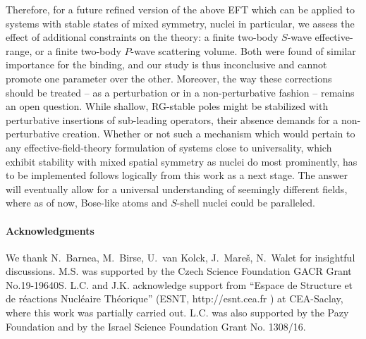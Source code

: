 \documentclass[preprint,12pt]{elsarticle}
\begin{document}
Therefore, for a future refined version of the above EFT which can be applied to systems with stable states of mixed symmetry,
nuclei in particular, we assess the effect of additional constraints on the theory: a finite two-body $S$-wave effective-range,
or a finite two-body $P$-wave scattering volume. 
Both were found of similar importance for the binding, and our study is thus inconclusive and cannot promote one parameter over the other.
Moreover, the way these corrections should be treated -- as a perturbation or in a non-perturbative fashion -- remains an open question.
While shallow, RG-stable poles might be stabilized with perturbative insertions of sub-leading operators, their absence demands for a
non-perturbative creation.
Whether or not such a mechanism which would pertain to any effective-field-theory formulation of systems close to universality,
which exhibit stability with mixed spatial symmetry as nuclei do most prominently, has to be implemented follows logically from
this work as a next stage. The answer will eventually allow for a universal understanding of seemingly different fields, where as of now,
Bose-like atoms and $S$-shell nuclei could be paralleled. 

\paragraph*{Acknowledgments}
We thank N.~Barnea,  M.~Birse, U.~van Kolck, J.~Mare\v{s}, N.~Walet for insightful
discussions.
M.S. was supported by the Czech Science Foundation GACR Grant No.19-19640S.
L.C. and J.K. acknowledge support from ``Espace de Structure et de r\'eactions
Nucl\'eaire Th\'eorique''  (ESNT, http://esnt.cea.fr )  at CEA-Saclay, where this work
was partially carried out.
L.C. was also supported by the Pazy Foundation and by the
Israel Science Foundation Grant No. 1308/16.






\end{document}
